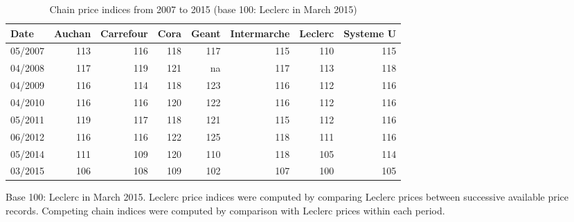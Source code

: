 \documentclass[english]{article}
\begin{document}
\begin{table}
\caption{Chain price indices from 2007 to 2015 (base 100: Leclerc in March 2015)}
\label{tab:qlmc_comparison_history}
\begin{threeparttable}
\begin{tabular}{lrrrrrrr}
    \toprule
    \toprule
    Date & Auchan & Carrefour & Cora  & Geant & Intermarche & Leclerc & Systeme U \\
    \midrule
    05/2007 & 113   & 116   & 118   & 117   & 115   & 110   & 115 \\
    04/2008 & 117   & 119   & 121   & na    & 117   & 113   & 118 \\
    04/2009 & 116   & 114   & 118   & 123   & 116   & 112   & 116 \\
    04/2010 & 116   & 116   & 120   & 122   & 116   & 112   & 116 \\
    05/2011 & 119   & 117   & 118   & 121   & 115   & 112   & 116 \\
    06/2012 & 116   & 116   & 122   & 125   & 118   & 111   & 116 \\
    05/2014 & 111   & 109   & 120   & 110   & 118   & 105   & 114 \\
    03/2015 & 106   & 108   & 109   & 102   & 107   & 100   & 105 \\
    \bottomrule
    \bottomrule
    \end{tabular}
\begin{tablenotes}
      \small
      \item Base 100: Leclerc in March 2015. Leclerc price indices were computed by comparing Leclerc prices between successive available price records. Competing chain indices were computed by comparison with Leclerc prices within each period.
\end{tablenotes}
\end{threeparttable}
\end{table}
\end{document}
